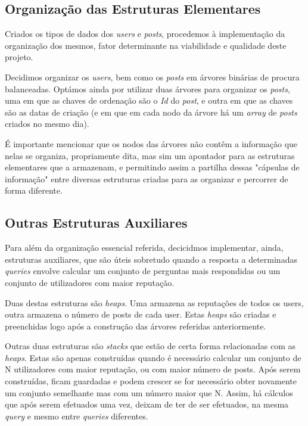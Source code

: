 \documentclass[10pt]{article}
\begin{document}
\pagebreak	
\subsection{Organização das Estruturas Elementares}
		
		Criados os tipos de dados dos \textit{users} e \textit{posts}, procedemos 
	à implementação da organização dos mesmos, fator determinante na viabilidade e 
	qualidade deste projeto.
	
		Decidimos organizar os \textit{users}, bem como os \textit{posts} em árvores
	binárias de procura balanceadas. Optámos ainda por utilizar duas árvores para
	organizar os \textit{posts}, uma em que as chaves de ordenação são o \textit{Id} do 
	\textit{post},	e outra em que as chaves são as datas de criação (e em que em cada
	nodo da árvore há um \textit{array} de \textit{posts} criados no mesmo dia).
	
		É importante mencionar que os nodos das árvores não contêm a informação que
	nelas se organiza, propriamente dita, mas sim um apontador para as estruturas
	elementares que a armazenam, e permitindo assim a partilha dessas "cápsulas de informação"
	entre diversas estruturas criadas para as organizar e percorrer de forma diferente.
	
\subsection{Outras Estruturas Auxiliares}
		
		Para além da organização essencial referida, decicidmos implementar, ainda, 
	estruturas auxiliares, que são úteis sobretudo quando a resposta a determinadas
	\textit{queries} envolve calcular um conjunto de perguntas mais respondidas ou 
	um conjunto de	utilizadores com maior reputação.
	
		Duas destas estruturas são \textit{heaps}. Uma armazena as reputações de todos os
	users, outra armazena o número de posts de cada user. Estas \textit{heaps} são
	criadas e preenchidas logo após a construção das árvores referidas anteriormente.
	
		Outras duas estruturas são \textit{stacks} que estão de certa forma relacionadas
	com as \textit{heaps}. Estas são apenas construídas quando é necessário calcular
	um conjunto de N utilizadores com maior reputação, ou com maior número de posts.
	Após serem construídas, ficam guardadas e podem crescer se for necessário obter
	novamente um conjunto semelhante mas com um número maior que N.
		Assim, há cálculos que após serem efetuados uma vez, deixam de ter de ser efetuados,
	na mesma \textit{query} e mesmo entre \textit{queries} diferentes.
\end{document}
